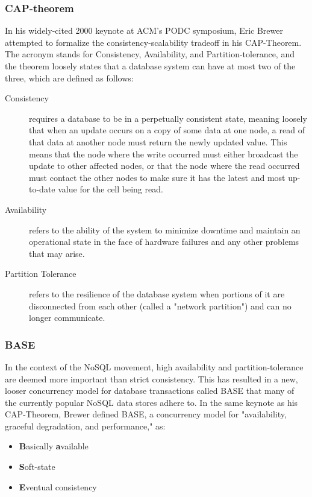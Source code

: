 \documentclass[11pt,a4paper]{report}
\begin{document}
\subsubsection{CAP-theorem}
In his widely-cited 2000 keynote at ACM's PODC symposium, Eric Brewer attempted to formalize the consistency-scalability tradeoff in his CAP-Theorem.\cite{brewer2000towards} The acronym stands for Consistency, Availability, and Partition-tolerance, and the theorem loosely states that a database system can have at most two of the three, which are defined as follows:

\begin{description}
\item[Consistency] 
requires a database to be in a perpetually consistent state, meaning loosely that when an update occurs on a copy of some data at one node, a read of that data at another node must return the newly updated value. This means that the node where the write occurred must either broadcast the update to other affected nodes, or that the node where the read occurred must contact the other nodes to make sure it has the latest and most up-to-date value for the cell being read.
\item[Availability] refers to the ability of the system to minimize downtime and maintain an operational state in the face of hardware failures and any other problems that may arise.
\item[Partition Tolerance] refers to the resilience of the database system when portions of it are disconnected from each other (called a "network partition") and can no longer communicate.
\end{description}

\subsubsection{BASE}
In the context of the NoSQL movement, high availability and partition-tolerance are deemed more important than strict consistency. This has resulted in a new, looser concurrency model for database transactions called BASE that many of the currently popular NoSQL data stores adhere to. In the same keynote as his CAP-Theorem, Brewer defined BASE, a concurrency model for "availability, graceful degradation, and performance," as:
\begin{itemize}
\item \textbf{B}asically \textbf{a}vailable
\item \textbf{S}oft-state
\item \textbf{E}ventual consistency
\end{itemize}
\end{document}
